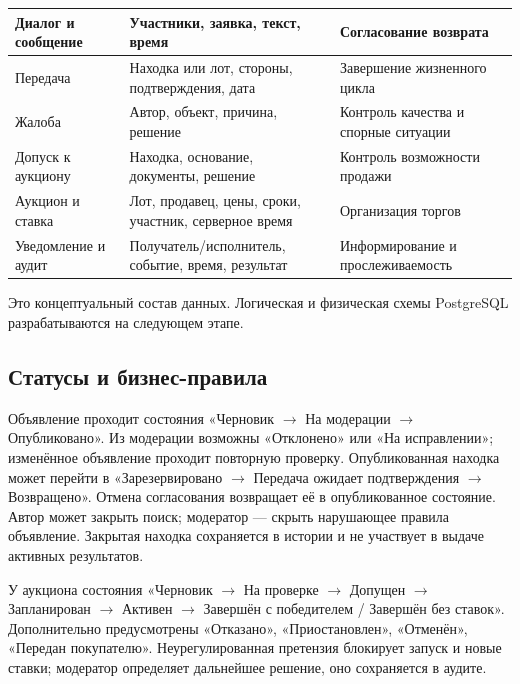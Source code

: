 \begin{longtable}{|>{\RaggedRight\arraybackslash}p{0.28\tablecontentwidth}|>{\RaggedRight\arraybackslash}p{0.32\tablecontentwidth}|>{\RaggedRight\arraybackslash}p{0.40\tablecontentwidth}|}
Диалог и сообщение & Участники, заявка, текст, время & Согласование возврата \\ \hline
Передача & Находка или лот, стороны, подтверждения, дата & Завершение жизненного цикла \\ \hline
Жалоба & Автор, объект, причина, решение & Контроль качества и спорные ситуации \\ \hline
Допуск к аукциону & Находка, основание, документы, решение & Контроль возможности продажи \\ \hline
Аукцион и ставка & Лот, продавец, цены, сроки, участник, серверное время & Организация торгов \\ \hline
Уведомление и аудит & Получатель/\allowbreak{}исполнитель, событие, время, результат & Информирование и прослеживаемость \\ \hline
\end{longtable}
\endgroup

Это концептуальный состав данных. Логическая и физическая схемы Postgre\allowbreak{}SQL разрабатываются на следующем этапе.

\FloatBarrier
{}
\subsection{Статусы и бизнес-правила}

Объявление проходит состояния «Черновик \ensuremath{\rightarrow} На модерации \ensuremath{\rightarrow} Опубликовано». Из модерации возможны «Отклонено» или «На исправлении»; изменённое объявление проходит повторную проверку. Опубликованная находка может перейти в «Зарезервировано \ensuremath{\rightarrow} Передача ожидает подтверждения \ensuremath{\rightarrow} Возвращено». Отмена согласования возвращает её в опубликованное состояние. Автор может закрыть поиск; модератор — скрыть нарушающее правила объявление. Закрытая находка сохраняется в истории и не участвует в выдаче активных результатов.

У аукциона состояния «Черновик \ensuremath{\rightarrow} На проверке \ensuremath{\rightarrow} Допущен \ensuremath{\rightarrow} Запланирован \ensuremath{\rightarrow} Активен \ensuremath{\rightarrow} Завершён с победителем /\allowbreak{} Завершён без ставок». Дополнительно предусмотрены «Отказано», «Приостановлен», «Отменён», «Передан покупателю». Неурегулированная претензия блокирует запуск и новые ставки; модератор определяет дальнейшее решение, оно сохраняется в аудите.

